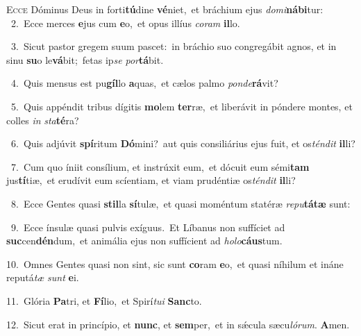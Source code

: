\lettrine{\initial\textcolor{\initialcolor}{E}}{cce} Dóminus Deus in forti\-\textbf{tú}\-dine \textbf{vé}\-niet,~\star et bráchium ejus \textit{do}\-\textit{mi}\textbf{ná}\textbf{bi}tur:\\
{\numbfont\textcolor{\numbcolor}{~2.}}~Ecce merces \textbf{e}\-jus cum \textbf{e}\-o,~\star et opus illíus \textit{co}\-\textit{ram} \textbf{il}\-lo.\par
{\numbfont\textcolor{\numbcolor}{~3.}}~Sicut pastor gregem suum pascet:~\dagger in bráchio suo congregábit agnos, et in sinu \textbf{su}\-o le\-\textbf{vá}\-bit;~\star fetas ip\textit{se} \textit{por}\-\textbf{tá}bit.\par
{\numbfont\textcolor{\numbcolor}{~4.}}~Quis mensus est pu\-\textbf{gíl}\-lo \textbf{a}\-quas,~\star et cælos palmo \textit{pon}\-\textit{de}\textbf{rá}vit?\par
{\numbfont\textcolor{\numbcolor}{~5.}}~Quis appéndit tribus dígitis \textbf{mo}\-lem \textbf{ter}\-ræ,~\star et liberávit in póndere montes, et colles \textit{in} \textit{sta}\-\textbf{té}ra?\par
{\numbfont\textcolor{\numbcolor}{~6.}}~Quis adjúvit \textbf{spí}\-ritum \textbf{Dó}\-mini?~\star aut quis consiliárius ejus fuit, et os\-\textit{tén}\-\textit{dit} \textbf{il}\-li?\par
{\numbfont\textcolor{\numbcolor}{~7.}}~Cum quo íniit consílium, et instrúxit eum,~\dagger et dócuit eum sémi\textbf{tam} jus\-\textbf{tí}\-tiæ,~\star et erudívit eum scíentiam, et viam prudéntiæ os\-\textit{tén}\-\textit{dit} \textbf{il}\-li?\par
{\numbfont\textcolor{\numbcolor}{~8.}}~Ecce Gentes quasi \textbf{stil}\-la \textbf{sí}\-tulæ,~\star et quasi moméntum statéræ \textit{re}\-\textit{pu}\textbf{tá}\textbf{tæ} sunt:\par
{\numbfont\textcolor{\numbcolor}{~9.}}~Ecce ínsulæ quasi pulvis exíguus.~\dagger Et Líbanus non suffíciet ad \textbf{suc}\-cen\-\textbf{dén}\-dum,~\star et animália ejus non suffícient ad \textit{ho}\-\textit{lo}\textbf{cáus}tum.\par
{\numbfont\textcolor{\numbcolor}{10.}}~Omnes Gentes quasi non sint, sic sunt \textbf{co}\-ram \textbf{e}\-o,~\star et quasi níhilum et ináne reputá\textit{tæ} \textit{sunt} \textbf{e}\-i.\par
{\numbfont\textcolor{\numbcolor}{11.}}~Glória \textbf{Pa}\-tri, et \textbf{Fí}\-lio,~\star et Spirí\-\textit{tu}\-\textit{i} \textbf{Sanc}\-to.\par
{\numbfont\textcolor{\numbcolor}{12.}}~Sicut erat in princípio, et \textbf{nunc}\-, et \textbf{sem}\-per,~\star et in sǽcula sæcu\-\textit{ló}\-\textit{rum}. \textbf{A}\-men.\par
